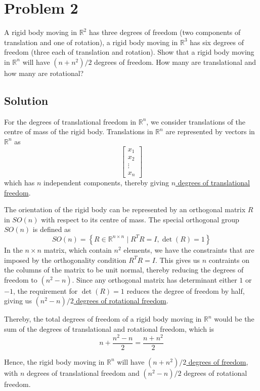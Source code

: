 \section*{Problem 2}

A rigid body moving in \( \mathbb{R}^{2} \) has three degrees of freedom (two components of translation and one of rotation), a rigid body moving in \( \mathbb{R}^{3} \) has six degrees of freedom (three each of translation and rotation).
Show that a rigid body moving in \( \mathbb{R}^{n} \) will have \( \left(n+n^{2}\right) / 2 \) degrees of freedom.
How many are translational and how many are rotational?

\subsection*{Solution}

For the degrees of translational freedom in \( \mathbb{R}^{n} \), we consider translations of the centre of mass of the rigid body.
Translations in \( \mathbb{R}^{n} \) are represented by vectors in \( \mathbb{R}^{n} \) as
\[
    \begin{bmatrix}
        x_{1}  \\
        x_{2}  \\
        \vdots \\
        x_{n}
    \end{bmatrix}
\]
which has \( n \) independent components, thereby giving \underline{\( n \) degrees of translational freedom}.

The orientation of the rigid body can be represented by an orthogonal matrix \( R \) in \( SO(n) \) with respect to its centre of mass.
The special orthogonal group \( SO(n) \) is defined as
\[
    SO(n) = \left \{ R \in \mathbb{R}^{n \times n} \mid R^{T}R = I, \det(R) = 1 \right \}
\]
In the \( n\times n \) matrix, which contain \( n^2 \) elements, we have the constraints that are imposed by the orthogonality condition \( R^{T}R = I \).
This gives us \( n \) contraints on the columns of the matrix to be unit normal, thereby reducing the degrees of freedom to \( ( n^2 - n ) \).
Since any orthogonal matrix has determinant either \( 1 \) or \( -1 \), the requirement for \( \det(R) = 1 \) reduces the degree of freedom by half, giving us \underline{\( (n^2 - n)/2 \) degrees of rotational freedom}.

Thereby, the total degrees of freedom of a rigid body moving in \( \mathbb{R}^{n} \) would be the sum of the degrees of translational and rotational freedom, which is
\[
    n + \frac{n^2 - n}{2} = \frac{n + n^2}{2}
\]

Hence, the rigid body moving in \( \mathbb{R}^{n} \) will have \underline{\( \left(n+n^{2}\right) / 2 \) degrees of freedom}, with \( n \) degrees of translational freedom and \( (n^2 - n)/2 \) degrees of rotational freedom.

